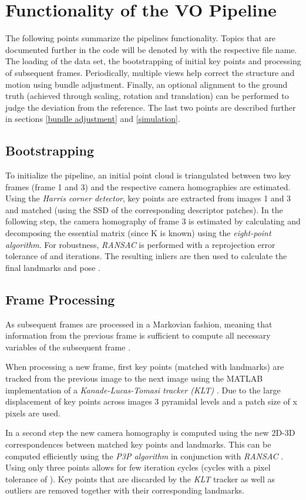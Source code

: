 \chapter{Functionality of the VO Pipeline}
The following points summarize the pipelines functionality. 
Topics that are documented further in the code will be denoted by  with the respective file name. 
The loading of the data set, the bootstrapping of initial key points and processing of subsequent frames. 
Periodically, multiple views help correct the structure and motion using bundle adjustment. 
Finally, an optional alignment to the ground truth (achieved through scaling, rotation and translation) can be performed to judge the deviation from the reference. 
The last two points are described further in sections \ref{bundle adjustment} and \ref{simulation}.

\section{Bootstrapping}
To initialize the pipeline, an initial point cloud is triangulated between two key frames (frame 1 and 3) and the respective camera homographies are estimated. 
Using the \emph{Harris corner detector}, key points are extracted from images 1 and 3 and matched (using the SSD of the corresponding descriptor patches).
In the following step, the camera homography of frame 3 is estimated by calculating and decomposing the essential matrix (since K is known) using the \emph{eight-point algorithm}. 
For robustness, \emph{RANSAC} is performed with a reprojection error tolerance of \ransacPixelTolerance and \ransacNumIterations iterations. 
The resulting inliers are then used to calculate the final landmarks and pose .      

\section{Frame Processing}
As subsequent frames are processed in a Markovian fashion, meaning that information from the previous frame is sufficient to compute all necessary variables of the subsequent frame . \par
When processing a new frame, first key points (matched with landmarks) are tracked from the previous image to the next image using the MATLAB implementation of a \emph{Kanade-Lucas-Tomasi tracker (KLT)} . 
Due to the large displacement of key points across images 3 pyramidal levels and a patch size of \trackerBlocksize x \trackerBlocksize pixels are used. \par
In a second step the new camera homography is computed using the new 2D-3D correspondences between matched key points and landmarks. 
This can be computed efficiently using the \emph{P3P algorithm} in conjunction with \emph{RANSAC} . 
Using only three points allows for few iteration cycles (\ransacNumIterations cycles with a pixel tolerance of \ransacPixelTolerance). 
Key points that are discarded by the \emph{KLT} tracker as well as outliers are removed together with their corresponding landmarks.\par

